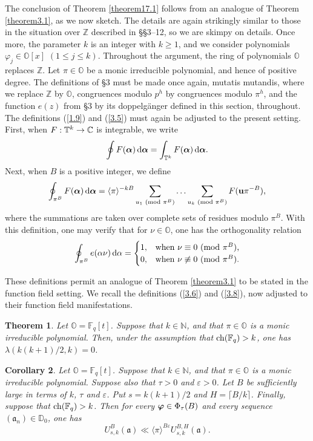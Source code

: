 \documentclass[12pt,reqno]{amsart}
\newtheorem{theorem}{Theorem}[section]
\newtheorem{corollary}[theorem]{Corollary}
\theoremstyle{definition}
\theoremstyle{remark}
\numberwithin{equation}{section}
\newcommand{\mmod}[1]{\,\,(\text{\rm mod}\,\,#1)}
\def\bfu{{\mathbf u}}
\def\dbC{{\mathbb C}}\def\dbD{{\mathbb D}}
\def\dbF{{\mathbb F}}\def\dbK{{\mathbb K}}
\def\dbN{{\mathbb N}} \def\dbO{{\mathbb O}} \def\dbP{{\mathbb P}}
\def\dbZ{{\mathbb Z}}\def\dbQ{{\mathbb Q}}
\def\gra{{\mathfrak a}}\def\grA{{\mathfrak A}}\def\bfgra{{\boldsymbol \gra}}
\def\alp{{\alpha}} \def\bfalp{{\boldsymbol \alpha}}
\def\lam{{\lambda}} \def\Lam{{\Lambda}} \def\Lamtil{{\widetilde \Lambda}}
\def\eps{\varepsilon}
\def\le{\leqslant} \def\ge{\geqslant} \def\pleq{\preccurlyeq} \def\ple{\prec}
\def\d{{\,{\rm d}}}
\begin{document}
The conclusion of Theorem \ref{theorem17.1} follows from an analogue of Theorem 
\ref{theorem3.1}, as we now sketch. The details are again strikingly similar to those in the 
situation over $\dbZ$ described in \S\S3--12, so we are skimpy on details. Once more, the 
parameter $k$ is an integer with $k\ge 1$, and we consider polynomials 
$\varphi_j\in \dbO[x]$ $(1\le j\le k)$. Throughout the argument, the ring of polynomials 
$\dbO$ replaces $\dbZ$. Let $\pi\in \dbO$ be a monic irreducible polynomial, and hence of 
positive degree. The definitions of \S3 must be made once again, mutatis mutandis, where 
we replace $\dbZ$ by $\dbO$, congruences modulo $p^h$ by congruences modulo $\pi^h$, 
and the function $e(z)$ from \S3 by its doppelg\"anger defined in this section, throughout. 
The definitions (\ref{1.9}) and (\ref{3.5}) must again be adjusted to the present setting. 
First, when $F:\dbT^k\rightarrow \dbC$ is integrable, we write
$$\oint F(\bfalp)\d\bfalp =\int_{\dbT^k}F(\bfalp)\d\bfalp .$$
Next, when $B$ is a positive integer, we define
$$\oint_{\pi^B}F(\bfalp)\d\bfalp =\langle \pi\rangle^{-kB}\sum_{u_1\mmod{\pi^B}}
\ldots \sum_{u_k\mmod{\pi^B}}F(\bfu \pi^{-B}),$$
where the summations are taken over complete sets of residues modulo $\pi^B$. With this 
definition, one may verify that for $\nu \in \dbO$, one has the orthogonality relation
$$\oint_{\pi^B}e(\alp \nu)\d\alp =\begin{cases} 1,&
\text{when $\nu\equiv 0\mmod{\pi^B}$,}\\
0,&\text{when $\nu\not\equiv 0\mmod{\pi^B}$.}\end{cases}$$

\par These definitions permit an analogue of Theorem \ref{theorem3.1} to be stated in the 
function field setting. We recall the definitions (\ref{3.6}) and (\ref{3.8}), now adjusted to 
their function field manifestations.

\begin{theorem}\label{theorem17.4} Let $\dbO=\dbF_q[t]$. Suppose that $k\in \dbN$, and 
that $\pi\in \dbO$ is a monic irreducible polynomial. Then, under the assumption that 
${\rm ch}(\dbF_q)>k$, one has $\lam(k(k+1)/2,k)=0$.
\end{theorem}

\begin{corollary}\label{corollary17.5} Let $\dbO=\dbF_q[t]$. Suppose that $k\in \dbN$, and 
that $\pi\in \dbO$ is a monic irreducible polynomial. Suppose also that $\tau>0$ and 
$\eps>0$. Let $B$ be sufficiently large in terms of $k$, $\tau$ and $\eps$. Put 
$s=k(k+1)/2$ and $H=\lceil B/k\rceil$. Finally, suppose that ${\rm ch}(\dbF_q)>k$. Then 
for every ${\boldsymbol \varphi}\in \Phi_\tau(B)$ and every sequence $(\gra_n)\in \dbD_0$, one has
$$U_{s,k}^B(\bfgra)\ll \langle \pi\rangle^{B\eps}U_{s,k}^{B,H}(\bfgra).$$
\end{corollary}
\end{document}
